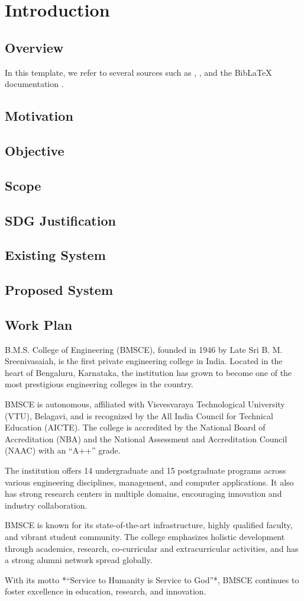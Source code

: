 \chapter{Introduction}
\section{Overview}
In this template, we refer to several sources such as \cite{sample_article}, \cite{sample_book}, and the BibLaTeX documentation \cite{sample_online}.
\section{Motivation}
\section{Objective}
\section{Scope}
\section{SDG Justification}
\section{Existing System}
\section{Proposed System}
\section{Work Plan}

B.M.S. College of Engineering (BMSCE), founded in 1946 by Late Sri B. M. Sreenivasaiah, 
is the first private engineering college in India. Located in the heart of Bengaluru, 
Karnataka, the institution has grown to become one of the most prestigious engineering 
colleges in the country. 

BMSCE is autonomous, affiliated with Visvesvaraya Technological University (VTU), Belagavi, 
and is recognized by the All India Council for Technical Education (AICTE). The college is 
accredited by the National Board of Accreditation (NBA) and the National Assessment and 
Accreditation Council (NAAC) with an “A++” grade.

The institution offers 14 undergraduate and 15 postgraduate programs across various 
engineering disciplines, management, and computer applications. It also has strong research 
centers in multiple domains, encouraging innovation and industry collaboration. 

BMSCE is known for its state-of-the-art infrastructure, highly qualified faculty, and vibrant 
student community. The college emphasizes holistic development through academics, research, 
co-curricular and extracurricular activities, and has a strong alumni network spread 
globally. 

With its motto *“Service to Humanity is Service to God”*, BMSCE continues to foster 
excellence in education, research, and innovation.
